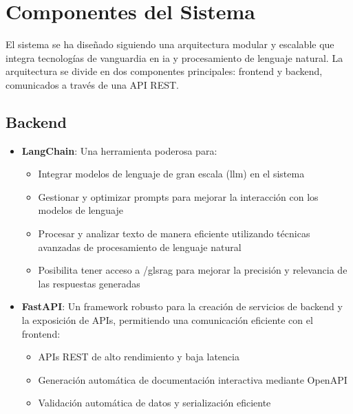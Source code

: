 \section{Componentes del Sistema}

El sistema se ha diseñado siguiendo una arquitectura modular y escalable que integra tecnologías de vanguardia en \gls{ia} y procesamiento de lenguaje natural. La arquitectura se divide en dos componentes principales: frontend y backend, comunicados a través de una API REST.

\subsection{Backend}

\begin{itemize}
	\item \textbf{LangChain}: Una herramienta poderosa para:
	      \begin{itemize}
		      \item Integrar modelos de lenguaje de gran escala (\gls{llm}) en el sistema
		      \item Gestionar y optimizar prompts para mejorar la interacción con los modelos de lenguaje
		      \item Procesar y analizar texto de manera eficiente utilizando técnicas avanzadas de procesamiento de lenguaje natural
		      \item Posibilita tener acceso a /gls{rag} para mejorar la precisión y relevancia de las respuestas generadas
	      \end{itemize}

	\item \textbf{FastAPI}: Un framework robusto para la creación de servicios de backend y la exposición de APIs, permitiendo una comunicación eficiente con el frontend:
	      \begin{itemize}
		      \item APIs REST de alto rendimiento y baja latencia
		      \item Generación automática de documentación interactiva mediante OpenAPI
		      \item Validación automática de datos y serialización eficiente
	      \end{itemize}
\end{itemize}

